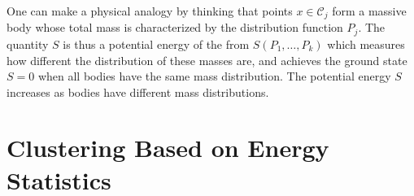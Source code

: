 \documentclass[aps,preprint,nofootinbib,floatfix]{revtex4-1}
\newcommand\C{{\mathcal{C}}}
\begin{document}
One can make a physical analogy by thinking 
that points $ x \in \C_j$ form a massive body 
whose total mass is characterized by the distribution function $P_j$.
The quantity $S$ is thus a potential
energy of the from $S(P_1,\dotsc,P_k)$ which measures how different
the distribution of these masses are,  and achieves the ground state
$S=0$ when all bodies have the same mass distribution. The potential energy
$S$ increases as bodies have different mass distributions.


\section{Clustering Based on Energy Statistics}
\label{sec:clustering_theory}







\end{document}
